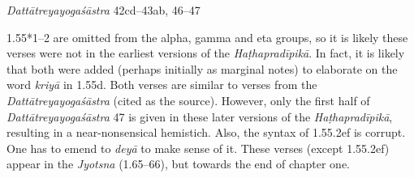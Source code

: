 \begin{ekdosis}
\begin{sources}[hp01_055_1]
\emph{Dattātreyayogaśāstra} 42cd–43ab, 46–47

\begin{versinnote}
\end{versinnote}

\end{sources}


\begin{philcomm}[hp01_055_1]
1.55*1–2 are omitted from the alpha, gamma and eta groups, so it is likely these verses were not in the earliest versions of the \emph{Haṭhapradīpikā}. In fact, it is likely that both were added (perhaps initially as marginal notes) to elaborate on the word \emph{kriyā} in 1.55d. Both verses are similar to verses from the \emph{Dattātreyayogaśāstra} (cited as the source). However, only the first half of \emph{Dattātreyayogaśāstra} 47 is given in these later versions of the \emph{Haṭhapradīpikā}, resulting in a near-nonsensical hemistich. Also, the syntax of 1.55.2ef is corrupt. One has to emend to \emph{deyā} to make sense of it. These verses (except 1.55.2ef) appear in the \emph{Jyotsna} (1.65–66), but towards the end of chapter one. 
\end{philcomm}




\end{ekdosis}
